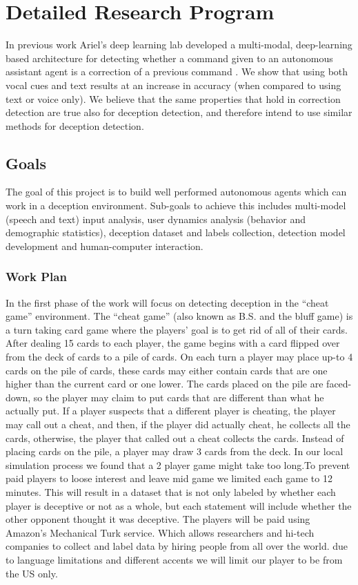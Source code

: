 \chapter {Detailed Research Program}

In previous work Ariel's deep learning lab developed a multi-modal, deep-learning based architecture for detecting whether a command given to an autonomous assistant agent is a correction of a previous command \cite{nivasch2019correction}.  We show that using both vocal cues and text results at an increase in accuracy (when compared to using text or voice only). We believe that the same properties that hold in correction detection are true also for deception detection, and therefore intend to use  similar methods for deception detection.

\section{Goals}
The goal of this project is to build well performed autonomous agents which can work in a deception environment. Sub-goals to achieve this includes multi-model (speech and text) input analysis, user dynamics analysis (behavior and demographic statistics), deception dataset and labels collection, detection model development and human-computer interaction.

\subsection{Work Plan}
In the first phase of the work will focus on detecting deception in the ``cheat game'' environment.
The ``cheat game'' (also known as B.S. and the bluff game) is a turn taking card game where the players' goal is to get rid of all of their cards. After dealing 15 cards to each player, the game begins with a card flipped over from the deck of cards to a pile of cards.
On each turn a player may place up-to 4 cards on the pile of cards, these cards may either contain cards that are one higher than the current card or one lower. The cards placed on the pile are faced-down, so the player may claim to put cards that are different than what he actually put. If a player suspects that a different player is cheating, the player may call out a cheat, and then, if the player did actually cheat, he collects all the cards, otherwise, the player that called out a cheat collects the cards. Instead of placing cards on the pile, a player may draw 3 cards from the deck. In our local simulation process we found that a 2 player game might take too long.To prevent paid players to loose interest and leave mid game we limited each game to 12 minutes. This will result in a dataset that is not only labeled by whether each player is deceptive or not as a whole, but each statement will include whether the other opponent thought it was deceptive. The players will be paid using Amazon's Mechanical Turk service. Which allows researchers and hi-tech companies to collect and label data by hiring people from all over the world. due to language limitations and different accents we will limit our player to be from the US only.    

